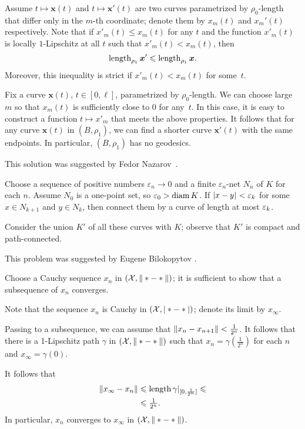 Assume $t\mapsto \bm{x}(t)$ and $t\mapsto \bm{x}'(t)$ are two curves parametrized by $\rho_0$-length that differ only in the $m$-th coordinate; denote them by $x_m(t)$ and $x_m'(t)$ respectively.
Note that if $x'_m(t)\le x_m(t)$ for any $t$ and 
the function $x'_m(t)$ is locally $1$-Lipschitz at all $t$ such that $x'_m(t)< x_m(t)$, then 
\[\mathop{\rm length}\nolimits_{\rho_1}\bm{x}'\leqslant \mathop{\rm length}\nolimits_{\rho_1}\bm{x}.\]
Moreover, this inequality is strict if $x'_m(t)< x_m(t)$ for some~$t$.

Fix a curve $\bm{x}(t)$, $t\in[0,\ell]$, parametrized by  $\rho_0$-length.
We can choose large $m$ so that $x_m(t)$ is sufficiently close to $0$ for any~$t$.
In this case, it is easy to construct a function $t\mapsto x'_m$ that meets the above properties.
It follows that for any curve $\bm{x}(t)$ in $(B,\rho_1)$, we can find a shorter curve $\bm{x}'(t)$ with the same endpoints.
In particular, $(B,\rho_1)$ has no geodesics.

This solution was suggested by Fedor Nazarov~\cite{nazarov}.

Choose a sequence of positive numbers $\varepsilon_n\to 0$ and a finite $\varepsilon_n$-net $N_n$ of $K$ for each $n$.
Assume $N_0$ is a one-point set, so $\varepsilon_0>\operatorname{\rm diam}\nolimits K$.
If $\dist{x}{y}{}<\eps_k$ for some $x\in N_{k+1}$ and $y\in N_{k}$, then connect them by a curve of length at most $\varepsilon_k$.

Consider the union $K'$ of all these curves with $K$; observe that $K'$ is compact and path-connected.

 This problem was suggested by Eugene Bilokopytov \cite{bilokopytov}.

Choose a Cauchy sequence $x_n$ in $(\mathcal{X},\|*-*\|)$; it is sufficient to show that a subsequence of $x_n$ converges.

Note that the sequence $x_n$ is Cauchy in $(\mathcal{X},|*-*|)$;
denote its limit by $x_\infty$.

Passing to a subsequence, we can assume that $\|x_n-x_{n+1}\|\z<\tfrac1{2^n}$.
It follows that there is a 1-Lipschitz path $\gamma$ in $(\mathcal{X},\|*-*\|)$ such that $x_n=\gamma(\tfrac1{2^n})$ for each $n$ and $x_\infty=\gamma(0)$.

It follows that
\begin{align*}
\|x_\infty-x_n\|&\leqslant \mathop{\rm length}\nolimits\gamma|_{[0,\frac1{2^n}]}\leqslant
\\
&\leqslant \tfrac1{2^n}.
\end{align*}
In particular, $x_n$ converges to $x_\infty$ in $(\mathcal{X},\|*-*\|)$.

